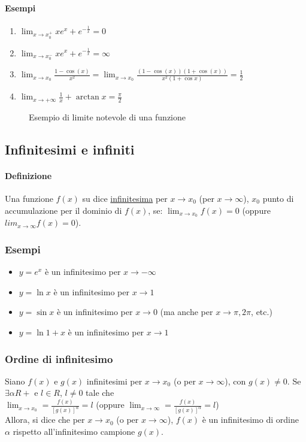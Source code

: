 \paragraph{Esempi}
\begin{multicols}{2}
	\begin{enumerate}
		\item $\lim_{x\to x_0^+}xe^x+e^{-\frac{1}{x}}=0$
		\item $\lim_{x\to x_0^-}xe^x+e^{-\frac{1}{x}}=\infty$
		\item $\lim_{x\to x_0}\frac{1-\cos (x)}{x^2}=\lim_{x\to
			x_0}\frac{(1-\cos (x))(1+\cos (x))}{x^2(1+\cos x)}=\frac{1}{2}$
		\item $\lim_{x\to +\infty}\frac{1}{x}+\arctan{x}=\frac{\pi}{2}$
	\end{enumerate}
\end{multicols}
\begin{figure}[!ht]
	\centering
	\caption{Esempio di limite notevole di una funzione}
\end{figure}

\subsection{Infinitesimi e infiniti}
\paragraph{Definizione}
Una funzione $f(x)$ su dice \underline{infinitesima} per $x\to x_0$ (per $x\to \infty$), $x_0$ punto di accumulazione per il dominio di $f(x)$, se: $\lim_{x\to x_0}f(x)=0$ (oppure $lim_{x\to \infty}f(x)=0$).
\subsubsection{Esempi}
\begin{itemize}
	\item $y=e^x$ è un infinitesimo per $x\to -\infty$
	\item $y=\ln{x}$ è un infinitesimo per $x\to 1$
	\item $y=\sin{x}$ è un infinitesimo per $x\to 0$ (ma anche per $x\to \pi,2\pi$, etc.)
	\item $y=\ln{1+x}$ è un infinitesimo per $x\to 1$ 
\end{itemize}
\subsubsection{Ordine di infinitesimo}
Siano $f(x)$ e $g(x)$ infinitesimi per $x\to{x_0}$ (o per $x\to \infty$), con $g(x)\neq 0$. Se $\exists\alpha R+$ e $l\in R$, $l\neq 0$ tale che\\
$\lim_{x\to{x_0}}=\frac{f(x)}{[g(x)]^\alpha}=l$ (oppure $\lim_{x\to{\infty}}=\frac{f(x)}{[g(x)]^\alpha}=l$)\\
Allora, si dice che per $x\to x_0$ (o per $x\to \infty$), $f(x)$ è un infinitesimo di ordine $\alpha$ rispetto all'infinitesimo campione $g(x)$.
